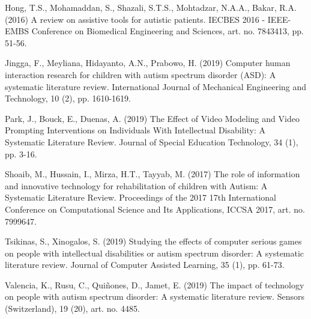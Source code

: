 \documentclass[utf8,english]{gradu3}
\begin{document}
\begin{footnotesize}
\begin{compactenum}
    \item Hong, T.S., Mohamaddan, S., Shazali, S.T.S., Mohtadzar, N.A.A., Bakar, R.A. (2016) A review on assistive tools for autistic patients. IECBES 2016 - IEEE-EMBS Conference on Biomedical Engineering and Sciences, art. no. 7843413, pp. 51-56.
    \item Jingga, F., Meyliana, Hidayanto, A.N., Prabowo, H. (2019) Computer human interaction research for children with autism spectrum disorder (ASD): A systematic literature review. International Journal of Mechanical Engineering and Technology, 10 (2), pp. 1610-1619.
    \item Park, J., Bouck, E., Duenas, A. (2019) The Effect of Video Modeling and Video Prompting Interventions on Individuals With Intellectual Disability: A Systematic Literature Review. Journal of Special Education Technology, 34 (1), pp. 3-16.
    \item Shoaib, M., Hussain, I., Mirza, H.T., Tayyab, M. (2017) The role of information and innovative technology for rehabilitation of children with Autism: A Systematic Literature Review. Proceedings of the 2017 17th International Conference on Computational Science and Its Applications, ICCSA 2017, art. no. 7999647.
    \item Tsikinas, S., Xinogalos, S. (2019) Studying the effects of computer serious games on people with intellectual disabilities or autism spectrum disorder: A systematic literature review. Journal of Computer Assisted Learning, 35 (1), pp. 61-73.
    \item Valencia, K., Rusu, C., Quiñones, D., Jamet, E. (2019) The impact of technology on people with autism spectrum disorder: A systematic literature review. Sensors (Switzerland), 19 (20), art. no. 4485.
  \end{compactenum}


\end{footnotesize}
\end{document}
